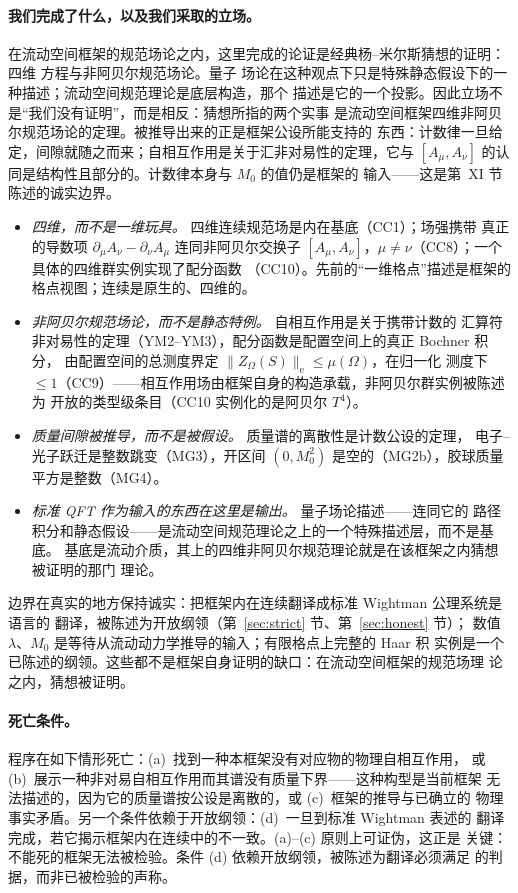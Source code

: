 \documentclass[aps,prd,preprint,superscriptaddress,amsmath,amssymb]{revtex4-2}
\begin{document}
\paragraph{我们完成了什么，以及我们采取的立场。}
在流动空间框架的规范场论之内，这里完成的论证是经典杨--米尔斯猜想的证明：四维
方程与非阿贝尔规范场论。量子
场论在这种观点下只是特殊静态假设下的一种描述；流动空间规范理论是底层构造，那个
描述是它的一个投影。因此立场不是``我们没有证明''，而是相反：猜想所指的两个实事
是流动空间框架四维非阿贝尔规范场论的定理。被推导出来的正是框架公设所能支持的
东西：计数律一旦给定，间隙就随之而来；自相互作用是关于汇非对易性的定理，它与
$[A_\mu,A_\nu]$ 的认同是结构性且部分的。计数律本身与 $M_0$ 的值仍是框架的
输入——这是第~XI 节陈述的诚实边界。
\begin{itemize}
\item \emph{四维，而不是一维玩具。} 四维连续规范场是内在基底（CC1）；场强携带
真正的导数项 $\partial_\mu A_\nu-\partial_\nu A_\mu$ 连同非阿贝尔交换子
$[A_\mu,A_\nu]$，$\mu\neq\nu$（CC8）；一个具体的四维群实例实现了配分函数
（CC10）。先前的``一维格点''描述是框架的格点视图；连续是原生的、四维的。
\item \emph{非阿贝尔规范场论，而不是静态特例。} 自相互作用是关于携带计数的
汇算符非对易性的定理（YM2--YM3），配分函数是配置空间上的真正 Bochner 积分，
由配置空间的总测度界定 $\|Z_\Omega(S)\|_\mathrm{e}\le\mu(\Omega)$，在归一化
测度下 $\le1$（CC9）——相互作用场由框架自身的构造承载，非阿贝尔群实例被陈述为
开放的类型级条目（CC10 实例化的是阿贝尔 $T^4$）。
\item \emph{质量间隙被推导，而不是被假设。} 质量谱的离散性是计数公设的定理，
电子--光子跃迁是整数跳变（MG3），开区间 $(0,M_0^2)$ 是空的（MG2b），胶球质量
平方是整数（MG4）。
\item \emph{标准 QFT 作为输入的东西在这里是输出。} 量子场论描述——连同它的
路径积分和静态假设——是流动空间规范理论之上的一个特殊描述层，而不是基底。
基底是流动介质，其上的四维非阿贝尔规范理论就是在该框架之内猜想被证明的那门
理论。
\end{itemize}

边界在真实的地方保持诚实：把框架内在连续翻译成标准 Wightman 公理系统是语言的
翻译，被陈述为开放纲领（第~\ref{sec:strict} 节、第~\ref{sec:honest} 节）；
数值 $\lambda$、$M_0$ 是等待从流动动力学推导的输入；有限格点上完整的 Haar 积
实例是一个已陈述的纲领。这些都不是框架自身证明的缺口：在流动空间框架的规范场理
论之内，猜想被证明。

\paragraph{死亡条件。}
程序在如下情形死亡：(a)~找到一种本框架没有对应物的物理自相互作用，
或 (b)~展示一种非对易自相互作用而其谱没有质量下界——这种构型是当前框架
无法描述的，因为它的质量谱按公设是离散的，或 (c)~框架的推导与已确立的
物理事实矛盾。另一个条件依赖于开放纲领：(d)~一旦到标准 Wightman 表述的
翻译完成，若它揭示框架内在连续中的不一致。(a)--(c) 原则上可证伪，这正是
关键：不能死的框架无法被检验。条件 (d) 依赖开放纲领，被陈述为翻译必须满足
的判据，而非已被检验的声称。
\end{document}
